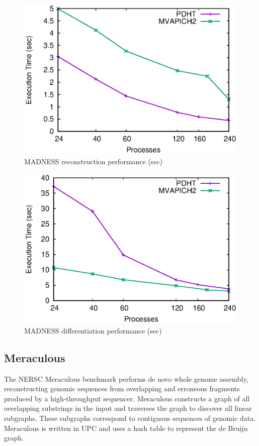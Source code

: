 \begin{figure}
  \centering
  \includegraphics[width=.88\linewidth]{plots/reconstruct}
  \caption{MADNESS reconstruction performance (sec)}
  \label{fig:mad-reconstruct}
\end{figure}


\begin{figure}
  \centering
  \includegraphics[width=.88\linewidth]{plots/diff}
  \caption{MADNESS differentiation performance (sec)}
  \label{fig:mad-diff}
\end{figure}

\subsection{Meraculous}

The NERSC Meraculous benchmark performs de novo whole genome assembly,
reconstructing genomic sequences from overlapping and erroneous fragments
produced by a high-throughput sequencer. Meraculous constructs a graph of all
overlapping substrings in the input and traverses the graph to discover all
linear subgraphs. These subgraphs correspond to contiguous sequences of
genomic data. Meraculous is written in UPC and uses a hash table
to represent the de Bruijn graph. 



